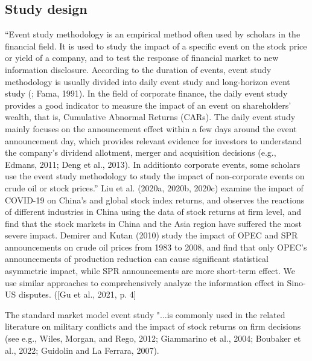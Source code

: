 \documentclass[12pt,a4paper]{article}
\begin{document}
 \subsection{Study design}
“Event study methodology is an empirical method often used by scholars in the financial field. It is used to study the impact of a specific event on the stock price or yield of a company, and to test the response of financial market to new information disclosure. According to the duration of events, event study methodology is usually divided into daily event study and long-horizon event study (\citep{brown_using_1985}; Fama, 1991). In the field of corporate finance, the daily event study provides a good indicator to measure the impact of an event on shareholders’ wealth, that is, Cumulative Abnormal Returns (CARs). The daily event study mainly focuses on the announcement effect within a few days around the event announcement day, which provides relevant evidence for investors to understand the company’s dividend allotment, merger and acquisition decisions (e.g., Edmans, 2011; Deng et al., 2013). In additionto corporate events, some scholars use the event study methodology to study the impact of non-corporate events on crude oil or stock prices.” 
Liu et al. (2020a, 2020b, 2020c) examine the impact of COVID-19 on China’s and global stock index returns, and observes the reactions of different industries in China using the data of stock returns at firm level, and find that the stock markets in China and the Asia region have suffered the most severe impact. Demirer and Kutan (2010) study the impact of OPEC and SPR announcements on crude oil prices from 1983 to 2008, and find that only OPEC’s announcements of production reduction can cause significant statistical asymmetric impact, while SPR announcements are more short-term effect. We use similar approaches to comprehensively analyze the information effect in Sino-US disputes. ([Gu et al., 2021, p. 4] \citep{gu_how_2021}

The standard market model event study "...is commonly used in the related literature on military conflicts and the impact of stock returns on firm decisions (see e.g., Wiles, Morgan, and Rego, 2012; Giammarino et al., 2004; Boubaker et al., 2022; Guidolin and La Ferrara, 2007). \citep[p.~8]{kiesel_should_2023} %
 
\end{document}
